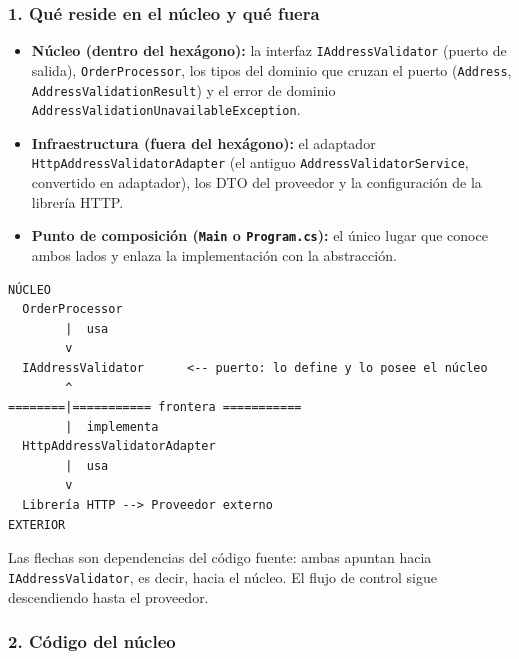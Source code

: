\documentclass[11pt,a4paper]{article}
\begin{document}
\subsubsection*{1. Qué reside en el núcleo y qué fuera}

\begingroup\sloppy
\begin{itemize}[leftmargin=1.4em]
\item \textbf{Núcleo (dentro del hexágono):} la interfaz \texttt{IAddressValidator} (puerto de
salida), \texttt{OrderProcessor}, los tipos del dominio que cruzan el puerto
(\texttt{Address}, \texttt{AddressValidationResult}) y el error de dominio
\texttt{AddressValidation\allowbreak Unavailable\allowbreak Exception}.
\item \textbf{Infraestructura (fuera del hexágono):} el adaptador
\texttt{HttpAddressValidatorAdapter} (el antiguo \texttt{AddressValidatorService}, convertido en adaptador), los DTO del proveedor y la
configuración de la librería HTTP.
\item \textbf{Punto de composición (\texttt{Main} o \texttt{Program.cs}):} el único lugar que
conoce ambos lados y enlaza la implementación con la abstracción.
\end{itemize}
\endgroup

\noindent\begin{minipage}{\linewidth}
\begin{lstlisting}
NÚCLEO
  OrderProcessor
        |  usa
        v
  IAddressValidator      <-- puerto: lo define y lo posee el núcleo
        ^
========|=========== frontera ===========
        |  implementa
  HttpAddressValidatorAdapter
        |  usa
        v
  Librería HTTP --> Proveedor externo
EXTERIOR
\end{lstlisting}
\end{minipage}

Las flechas son dependencias del código fuente: ambas apuntan hacia
\texttt{IAddressValidator}, es decir, hacia el núcleo. El flujo de control sigue descendiendo
hasta el proveedor.

\subsubsection*{2. Código del núcleo}
\end{document}
